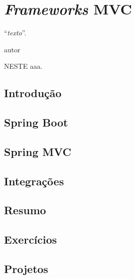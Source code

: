 \chapter{\textit{Frameworks} MVC}\label{cap:frameworksMVC}
\epigraph{``\textit{texto}''.}{autor}

\lettrine[lines=4, lhang=0.1, lraise=0, loversize=0.2, findent=0.1em]{\textcolor{corAzulTema}{N}}{ESTE} aaa.

\section{Introdução}

\section{Spring Boot}

\section{Spring MVC}

\section{Integrações}

\section{Resumo}

\section{Exercícios}

\section{Projetos}
